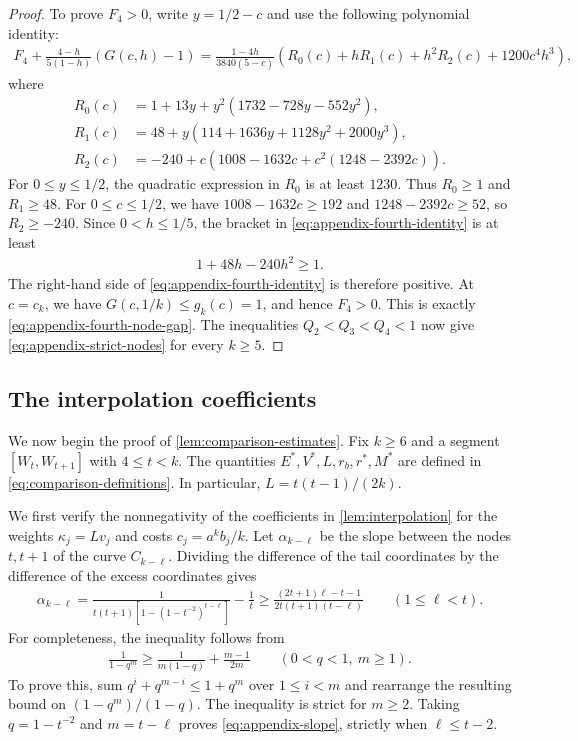 \begin{proof}
To prove $F_4>0$, write $y=1/2-c$ and use the following polynomial identity:
\begin{align}\label{eq:appendix-fourth-identity}
F_4+\frac{4-h}{5(1-h)}(G(c,h)-1)
=\frac{1-4h}{3840(5-c)}
\left(R_0(c)+hR_1(c)+h^2R_2(c)+1200c^4h^3\right),
\end{align}
where
\begin{align*}
R_0(c)&=1+13y+y^2(1732-728y-552y^2),\\
R_1(c)&=48+y(114+1636y+1128y^2+2000y^3),\\
R_2(c)&=-240+c\left(1008-1632c+c^2(1248-2392c)\right).
\end{align*}
For $0\le y\le1/2$, the quadratic expression in $R_0$ is at least $1230$. Thus $R_0\ge1$ and $R_1\ge48$. For $0\le c\le1/2$, we have $1008-1632c\ge192$ and $1248-2392c\ge52$, so $R_2\ge-240$. Since $0<h\le1/5$, the bracket in \cref{eq:appendix-fourth-identity} is at least
\begin{align*}
1+48h-240h^2\ge1.
\end{align*}
The right-hand side of \cref{eq:appendix-fourth-identity} is therefore positive. At $c=c_k$, we have $G(c,1/k)\le g_k(c)=1$, and hence $F_4>0$. This is exactly \cref{eq:appendix-fourth-node-gap}. The inequalities $Q_2<Q_3<Q_4<1$ now give \cref{eq:appendix-strict-nodes} for every $k\ge5$.
\end{proof}

\subsection{The interpolation coefficients}

We now begin the proof of \cref{lem:comparison-estimates}. Fix $k\ge6$ and a segment $[W_t,W_{t+1}]$ with $4\le t<k$. The quantities $E^*,V^*,L,r_b,r^*,M^*$ are defined in \cref{eq:comparison-definitions}. In particular, $L=t(t-1)/(2k)$.

We first verify the nonnegativity of the coefficients in \cref{lem:interpolation} for the weights $\kappa_j=Lv_j$ and costs $c_j=a^kb_j/k$. Let $\alpha_{k-\ell}$ be the slope between the nodes $t,t+1$ of the curve $C_{k-\ell}$. Dividing the difference of the tail coordinates by the difference of the excess coordinates gives
\begin{align}\label{eq:appendix-slope}
\alpha_{k-\ell}
=\frac1{t(t+1)\left[1-(1-t^{-2})^{t-\ell}\right]}-\frac1t
\ge\frac{(2t+1)\ell-t-1}{2t(t+1)(t-\ell)}
\qquad(1\le\ell<t).
\end{align}
For completeness, the inequality follows from
\begin{align*}
\frac1{1-q^m}\ge\frac1{m(1-q)}+\frac{m-1}{2m}
\qquad(0<q<1,\ m\ge1).
\end{align*}
To prove this, sum $q^i+q^{m-i}\le1+q^m$ over $1\le i<m$ and rearrange the resulting bound on $(1-q^m)/(1-q)$. The inequality is strict for $m\ge2$. Taking $q=1-t^{-2}$ and $m=t-\ell$ proves \cref{eq:appendix-slope}, strictly when $\ell\le t-2$.

